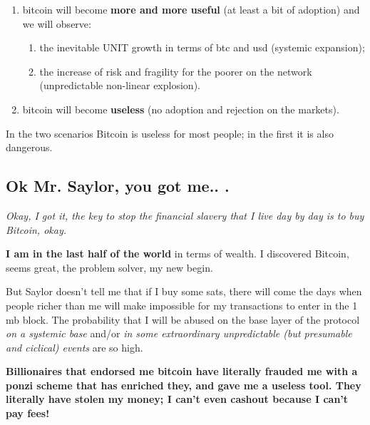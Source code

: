 \documentclass{article}
\begin{document}
\begin{enumerate}


	\item bitcoin will become \textbf{more and more useful} (at least a bit of adoption) and we will observe:

		\begin{enumerate}
	\item the inevitable UNIT growth in terms of btc and usd (systemic expansion);
	\item the increase of risk and fragility for the poorer on the network (unpredictable non-linear explosion).\vspace{0.6cm}

		\end{enumerate}

	\item bitcoin will become \textbf{useless} (no adoption and rejection on the markets).\vspace{1.2cm}


\end{enumerate}

 In the two scenarios Bitcoin is useless for most people; in the first it is also dangerous.


\subsection{Ok Mr. Saylor, you got me.. .}\vspace{0.3cm}


\emph{Okay, I got it, the key to stop the financial slavery that I live day by day is to buy Bitcoin, okay.}\vspace{0.5cm}


\textbf{I am in the last half of the world} in terms of wealth. I discovered Bitcoin, seems great, the problem solver, my new begin.\vspace{0.2cm}

But Saylor doesn't tell me that if I buy some sats, there will come the days when people richer than me will make impossible for my transactions to enter in the 1 mb block. The probability that I will be abused on the base layer of the protocol \emph{on a systemic base} and/or \emph{in some extraordinary unpredictable (but presumable and ciclical) events} are so high.\vspace{0.3cm}

\textbf{Billionaires that endorsed me bitcoin have literally frauded me with a ponzi scheme that has enriched they, and gave me a useless tool. They literally have stolen my money; I can't even cashout because I can't pay fees!}\vspace{0.2cm}
\end{document}

